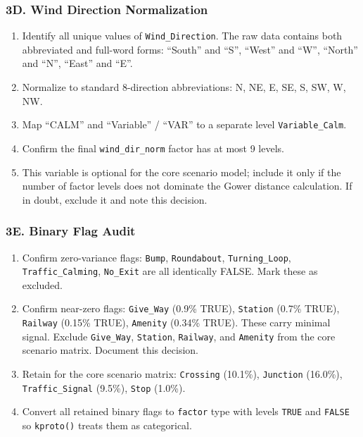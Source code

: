 \documentclass[11pt]{article}
\begin{document}
\subsubsection*{3D. Wind Direction Normalization}

\begin{enumerate}
  \item Identify all unique values of \texttt{Wind\_Direction}. The raw data contains both abbreviated and full-word forms: ``South'' and ``S'', ``West'' and ``W'', ``North'' and ``N'', ``East'' and ``E''.
  \item Normalize to standard 8-direction abbreviations: N, NE, E, SE, S, SW, W, NW.
  \item Map ``CALM'' and ``Variable'' / ``VAR'' to a separate level \texttt{Variable\_Calm}.
  \item Confirm the final \texttt{wind\_dir\_norm} factor has at most 9 levels.
  \item This variable is optional for the core scenario model; include it only if the number of factor levels does not dominate the Gower distance calculation. If in doubt, exclude it and note this decision.
\end{enumerate}

\subsubsection*{3E. Binary Flag Audit}

\begin{enumerate}
  \item Confirm zero-variance flags: \texttt{Bump}, \texttt{Roundabout}, \texttt{Turning\_Loop}, \texttt{Traffic\_Calming}, \texttt{No\_Exit} are all identically FALSE. Mark these as excluded.
  \item Confirm near-zero flags: \texttt{Give\_Way} (0.9\% TRUE), \texttt{Station} (0.7\% TRUE), \texttt{Railway} (0.15\% TRUE), \texttt{Amenity} (0.34\% TRUE). These carry minimal signal. Exclude \texttt{Give\_Way}, \texttt{Station}, \texttt{Railway}, and \texttt{Amenity} from the core scenario matrix. Document this decision.
  \item Retain for the core scenario matrix: \texttt{Crossing} (10.1\%), \texttt{Junction} (16.0\%), \texttt{Traffic\_Signal} (9.5\%), \texttt{Stop} (1.0\%).
  \item Convert all retained binary flags to \texttt{factor} type with levels \texttt{TRUE} and \texttt{FALSE} so \texttt{kproto()} treats them as categorical.
\end{enumerate}
\end{document}
